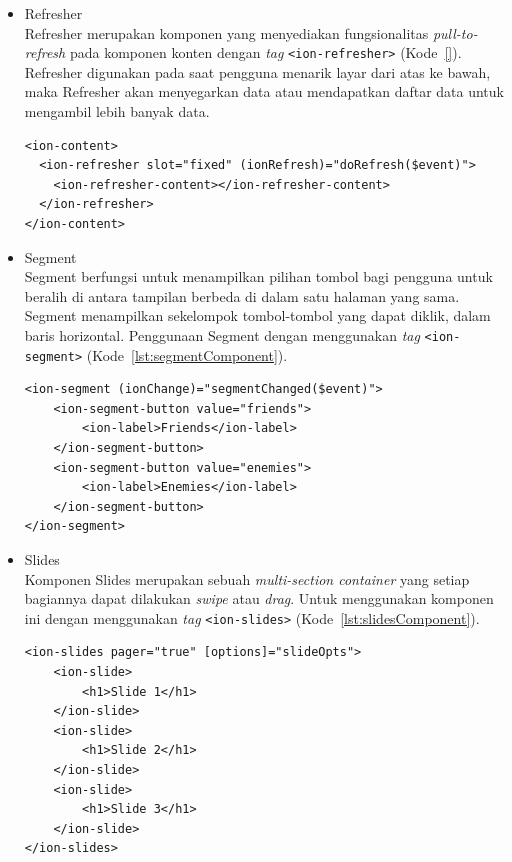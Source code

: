 \begin{itemize}
	\item Refresher \\
	Refresher merupakan komponen yang menyediakan fungsionalitas \textit{pull-to-refresh} pada komponen konten dengan \textit{tag} \texttt{<ion-refresher>} (Kode~\ref{}). Refresher digunakan pada saat pengguna menarik layar dari atas ke bawah, maka Refresher akan menyegarkan data atau mendapatkan daftar data untuk mengambil lebih banyak data. 
	
\begin{lstlisting}[label={lst:segmentComponent}, caption=Kode Program dari Refresher]
<ion-content>
  <ion-refresher slot="fixed" (ionRefresh)="doRefresh($event)">
    <ion-refresher-content></ion-refresher-content>
  </ion-refresher>
</ion-content>
\end{lstlisting}
	\item Segment \\
	Segment berfungsi untuk menampilkan pilihan tombol bagi pengguna untuk beralih di antara tampilan berbeda di dalam satu halaman yang sama. Segment menampilkan sekelompok tombol-tombol yang dapat diklik, dalam baris horizontal. Penggunaan Segment dengan menggunakan {\it tag} \texttt{<ion-segment>} (Kode~\ref{lst:segmentComponent}).
	
\begin{lstlisting}[label={lst:segmentComponent}, caption=Kode Program dari Segment]
<ion-segment (ionChange)="segmentChanged($event)">
	<ion-segment-button value="friends">
		<ion-label>Friends</ion-label>
	</ion-segment-button>
	<ion-segment-button value="enemies">
		<ion-label>Enemies</ion-label>
	</ion-segment-button>
</ion-segment>
\end{lstlisting}
	
	\item Slides \\
	Komponen Slides merupakan sebuah \textit{multi-section container} yang setiap bagiannya dapat dilakukan \textit{swipe} atau \textit{drag}. Untuk menggunakan komponen ini dengan menggunakan \textit{tag} \texttt{<ion-slides>} (Kode~\ref{lst:slidesComponent}).
	
\begin{lstlisting}[label={lst:slidesComponent}, caption=Kode Program dari Slides]
<ion-slides pager="true" [options]="slideOpts">
	<ion-slide>
		<h1>Slide 1</h1>
	</ion-slide>
	<ion-slide>
		<h1>Slide 2</h1>
	</ion-slide>
	<ion-slide>
		<h1>Slide 3</h1>
	</ion-slide>
</ion-slides>
\end{lstlisting}
	

\end{itemize}
